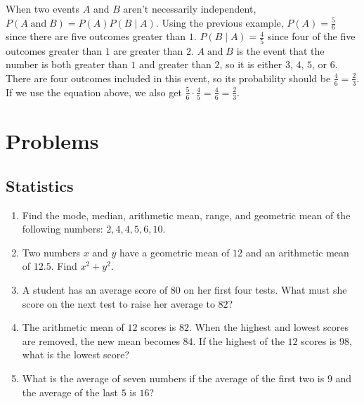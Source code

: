 \documentclass[twocolumn]{article}
\newcommand{\pand}{\mathop\text{and}}
\begin{document}
When two events $A$ and $B$ aren't necessarily independent, $P(A \pand B) = 
P(A)P(B \mid A)$. Using the previous example, $P(A) = \frac{5}{6}$ since there 
are five outcomes greater than $1$. $P(B \mid A) = \frac{4}{5}$ since four of 
the five outcomes greater than $1$ are greater than $2$. $A \pand B$ is the 
event that the number is both greater than $1$ and greater than $2$, so it is 
either $3$, $4$, $5$, or $6$. There are four outcomes included in this event, so 
its probability should be $\frac{4}{6} = \frac{2}{3}$. If we use the equation 
above, we also get $\frac{5}{6} \cdot \frac{4}{5} = \frac{4}{6} = \frac{2}{3}$.

\section*{Problems}

\subsection*{Statistics}
\begin{enumerate}
	\item Find the mode, median, arithmetic mean, range, and geometric mean
		of the following numbers: $2, 4, 4, 5, 6, 10$.
		\vspace{3cm}
	\item Two numbers $x$ and $y$ have a geometric mean of $12$ and an
		arithmetic mean of $12.5$. Find $x^2 + y^2$.
		\vspace{3cm}
	\item A student has an average score of $80$ on her first four tests.
		What must she score on the next test to raise her average to $82$?
		\vspace{3cm}
	\item The arithmetic mean of $12$ scores is $82$. When the highest and
		lowest scores are removed, the new mean becomes $84$. If the highest
		of the $12$ scores is $98$, what is the lowest score?
		\vspace{3cm}
	\item What is the average of seven numbers if the average of the first
		two is $9$ and the average of the last $5$ is $16$?
		\vspace{3cm}
\end{enumerate}
\end{document}
